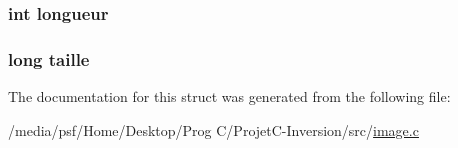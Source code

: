 \hypertarget{structimage_a99c1a2326077453a39e283a1dd9ca73e}{
\subsubsection[{longueur}]{\setlength{\rightskip}{0pt plus 5cm}int longueur}}\label{structimage_a99c1a2326077453a39e283a1dd9ca73e}
\hypertarget{structimage_aea7a6840da8c13886826ae0e87df1508}{
\subsubsection[{taille}]{\setlength{\rightskip}{0pt plus 5cm}long taille}}\label{structimage_aea7a6840da8c13886826ae0e87df1508}


The documentation for this struct was generated from the following file\-:\begin{DoxyCompactItemize}
\item 
/media/psf/\-Home/\-Desktop/\-Prog C/\-Projet\-C-\/\-Inversion/src/\hyperlink{image_8c}{image.\-c}\end{DoxyCompactItemize}
